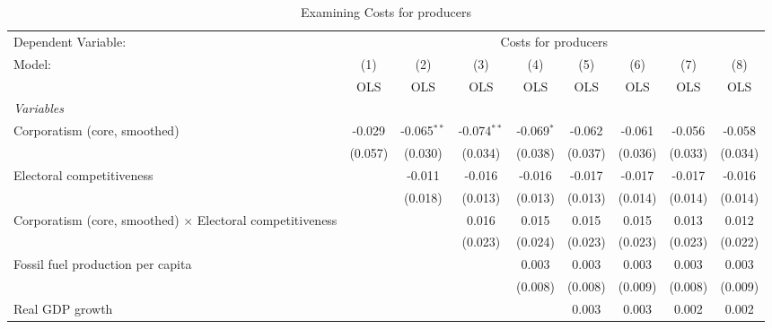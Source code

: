 
\begin{table}[htbp]
   \caption{Examining Costs for producers}
   \centering
   \begin{tabular}{lcccccccc}
      \toprule
      Dependent Variable: & \multicolumn{8}{c}{Costs for producers}\\
      Model:                                                           & (1)     & (2)           & (3)           & (4)          & (5)     & (6)     & (7)     & (8)\\  
                                                                       &  OLS    & OLS           & OLS           & OLS          & OLS     & OLS     & OLS     & OLS\\  
      \midrule
      \emph{Variables}\\
      Corporatism (core, smoothed)                                     & -0.029  & -0.065$^{**}$ & -0.074$^{**}$ & -0.069$^{*}$ & -0.062  & -0.061  & -0.056  & -0.058\\   
                                                                       & (0.057) & (0.030)       & (0.034)       & (0.038)      & (0.037) & (0.036) & (0.033) & (0.034)\\   
      Electoral competitiveness                                        &         & -0.011        & -0.016        & -0.016       & -0.017  & -0.017  & -0.017  & -0.016\\   
                                                                       &         & (0.018)       & (0.013)       & (0.013)      & (0.013) & (0.014) & (0.014) & (0.014)\\   
      Corporatism (core, smoothed) $\times$ Electoral competitiveness  &         &               & 0.016         & 0.015        & 0.015   & 0.015   & 0.013   & 0.012\\   
                                                                       &         &               & (0.023)       & (0.024)      & (0.023) & (0.023) & (0.023) & (0.022)\\   
      Fossil fuel production per capita                                &         &               &               & 0.003        & 0.003   & 0.003   & 0.003   & 0.003\\   
                                                                       &         &               &               & (0.008)      & (0.008) & (0.009) & (0.008) & (0.009)\\   
      Real GDP growth                                                  &         &               &               &              & 0.003   & 0.003   & 0.002   & 0.002\\   

\end{tabular}
\end{table}
